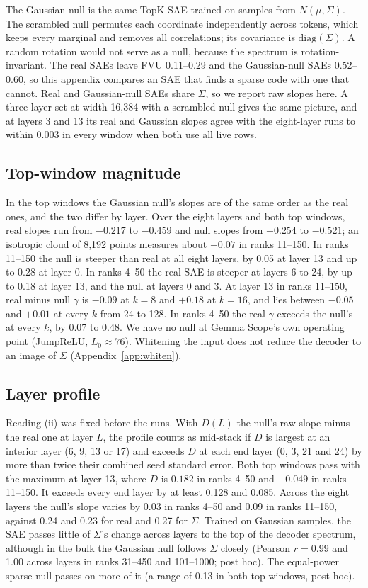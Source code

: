 \documentclass{article}
\newcommand{\Sig}{\Sigma}
\newcommand{\Lz}{L_0}
\begin{document}
The Gaussian null is the same TopK SAE trained on samples from $N(\mu,\Sig)$. The scrambled null permutes each coordinate independently across tokens, which keeps every marginal and removes all correlations; its covariance is $\mathrm{diag}(\Sig)$. A random rotation would not serve as a null, because the spectrum is rotation-invariant. The real SAEs leave FVU 0.11--0.29 and the Gaussian-null SAEs 0.52--0.60, so this appendix compares an SAE that finds a sparse code with one that cannot. Real and Gaussian-null SAEs share $\Sig$, so we report raw slopes here. A three-layer set at width 16,384 with a scrambled null gives the same picture, and at layers 3 and 13 its real and Gaussian slopes agree with the eight-layer runs to within 0.003 in every window when both use all live rows.

\subsection{Top-window magnitude}
\label{app:gtop}

In the top windows the Gaussian null's slopes are of the same order as the real ones, and the two differ by layer. Over the eight layers and both top windows, real slopes run from $-0.217$ to $-0.459$ and null slopes from $-0.254$ to $-0.521$; an isotropic cloud of 8,192 points measures about $-0.07$ in ranks 11--150. In ranks 11--150 the null is steeper than real at all eight layers, by 0.05 at layer 13 and up to 0.28 at layer 0. In ranks 4--50 the real SAE is steeper at layers 6 to 24, by up to 0.18 at layer 13, and the null at layers 0 and 3. At layer 13 in ranks 11--150, real minus null $\gamma$ is $-0.09$ at $k=8$ and $+0.18$ at $k=16$, and lies between $-0.05$ and $+0.01$ at every $k$ from 24 to 128. In ranks 4--50 the real $\gamma$ exceeds the null's at every $k$, by 0.07 to 0.48. We have no null at Gemma Scope's own operating point (JumpReLU, $\Lz \approx 76$). Whitening the input does not reduce the decoder to an image of $\Sig$ (Appendix~\ref{app:whiten}).

\subsection{Layer profile}
\label{app:gprofile}

Reading (ii) was fixed before the runs. With $D(L)$ the null's raw slope minus the real one at layer $L$, the profile counts as mid-stack if $D$ is largest at an interior layer (6, 9, 13 or 17) and exceeds $D$ at each end layer (0, 3, 21 and 24) by more than twice their combined seed standard error. Both top windows pass with the maximum at layer 13, where $D$ is $0.182$ in ranks 4--50 and $-0.049$ in ranks 11--150. It exceeds every end layer by at least 0.128 and 0.085. Across the eight layers the null's slope varies by 0.03 in ranks 4--50 and 0.09 in ranks 11--150, against 0.24 and 0.23 for real and 0.27 for $\Sig$. Trained on Gaussian samples, the SAE passes little of $\Sig$'s change across layers to the top of the decoder spectrum, although in the bulk the Gaussian null follows $\Sig$ closely (Pearson $r=0.99$ and 1.00 across layers in ranks 31--450 and 101--1000; post hoc). The equal-power sparse null passes on more of it (a range of 0.13 in both top windows, post hoc).
\end{document}
